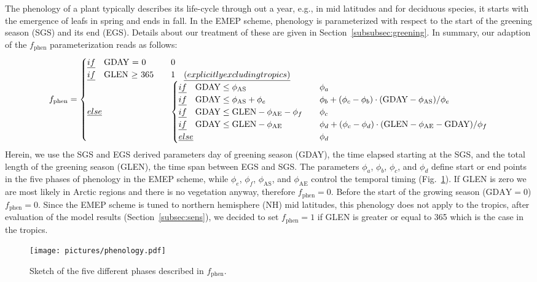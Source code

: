 \documentclass[gmd, manuscript]{copernicus}
\begin{document}
The phenology of a plant typically describes its life-cycle through out a year, e.g., in mid latitudes and for deciduous species, it starts with the emergence of leafs in spring and ends in fall. In the EMEP scheme, phenology is parameterized with respect to the start of the greening season (SGS) and its end (EGS). Details about our treatment of these are given in Section~\ref{subsubsec:greening}. In summary, our adaption of the $f_\text{phen}$ parameterization reads as follows:
%
\begin{equation}
  f_\text{phen} =
  \begin{cases}
    \emph{if} \quad \text{GDAY = 0}  & \quad 0 \\
    \emph{if} \quad \text{GLEN $\ge$ 365} & \quad 1 \quad \emph{(explicitly excluding tropics)} \\
    \emph{else}  & \quad 
    \begin{cases}
      \emph{if} \quad \text{GDAY} \le \phi_\text{AS}  & \quad \phi_a \\
      \emph{if} \quad \text{GDAY} \le \phi_\text{AS} + \phi_e  & \quad \phi_b+(\phi_c-\phi_b)\cdot(\text{GDAY}-\phi_\text{AS})/\phi_e\\
      \emph{if} \quad \text{GDAY} \le \text{GLEN} - \phi_\text{AE} - \phi_f  & \quad \phi_c\\
      \emph{if} \quad \text{GDAY} \le \text{GLEN} - \phi_\text{AE}  & \quad \phi_d+(\phi_c-\phi_d)\cdot(\text{GLEN}-\phi_\text{AE}-\text{GDAY})/\phi_f\\
      \emph{else} & \quad \phi_d
    \end{cases}
  \end{cases}
  \label{eq:fphen}
\end{equation}
%
Herein, we use the SGS and EGS derived parameters day of greening season (GDAY), the time elapsed starting at the SGS, and the total length of the greening season (GLEN), the time span between EGS and SGS. The parameters $\phi_a$, $\phi_b$, $\phi_c$, and $\phi_d$ define start or end points in the five phases of phenology in the EMEP scheme, while $\phi_e$, $\phi_f$, $\phi_\text{AS}$, and $\phi_\text{AE}$ control the temporal timing (Fig.~\ref{fig:phenology}). If GLEN is zero we are most likely in Arctic regions and there is no vegetation anyway, therefore $f_\text{phen}=0$. Before the start of the growing season ($\text{GDAY}=0$) $f_\text{phen}=0$. Since the EMEP scheme is tuned to northern hemisphere (NH) mid latitudes, this phenology does not apply to the tropics, after evaluation of the model results (Section~\ref{subsec:sens}), we decided to set $f_\text{phen}=1$ if GLEN is greater or equal to 365 which is the case in the tropics.
%
\begin{figure}[t]
  \texttt{[image: pictures/phenology.pdf]}
  \caption{Sketch of the five different phases described in $f_\text{phen}$.}
  \label{fig:phenology}
\end{figure}
\end{document}
